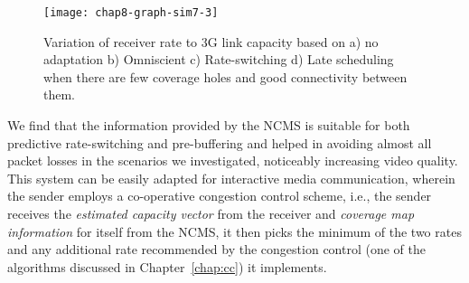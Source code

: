 \begin{figure}
\texttt{[image: chap8-graph-sim7-3]}
  \caption{Variation of receiver rate to 3G link capacity based on a) no
  adaptation b) Omniscient c) Rate-switching d) Late scheduling when there are
  few coverage holes and good connectivity between them.}
\label{fig:glass:sim7res}
\end{figure}

We find that the information provided by the NCMS is suitable for both
predictive rate-switching and pre-buffering and helped in avoiding almost all
packet losses in the scenarios we investigated, noticeably increasing video
quality. This system can be easily adapted for interactive media
communication, wherein the sender employs a co-operative congestion control
scheme, i.e., the sender receives the \emph{estimated capacity vector} from
the receiver and \emph{coverage map information} for itself from the NCMS, it
then picks the minimum of the two rates and any additional rate recommended by
the congestion control (one of the algorithms discussed in
Chapter~\ref{chap:cc}) it implements.